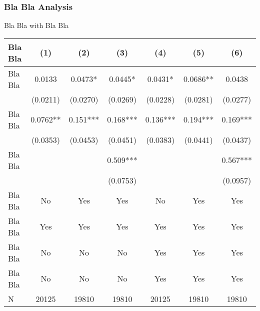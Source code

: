 \documentclass{beamer}
\begin{document}
\begin{frame}
\frametitle{Bla Bla Analysis}
Bla Bla with Bla Bla
\begin{table}
\centering
\tiny
\label{tab:diff_in_diff}
\begin{tabular}{lcccccc}
\toprule
Bla Bla & (1) & (2) & (3) & (4) & (5) & (6)\\
\midrule
Bla Bla & 0.0133 & 0.0473* & 0.0445* & 0.0431* & 0.0686** & 0.0438\\
 & (0.0211) & (0.0270) & (0.0269) & (0.0228) & (0.0281) & (0.0277)\\
Bla Bla & 0.0762** & 0.151*** & 0.168*** & 0.136*** & 0.194*** & 0.169***\\
 & (0.0353) & (0.0453) & (0.0451) & (0.0383) & (0.0441) & (0.0437)\\
Bla Bla &  &  & 0.509*** &  &  & 0.567***\\
 &  &  & (0.0753) &  &  & (0.0957)\\
 \midrule
Bla Bla & No & Yes & Yes & No & Yes & Yes\\
Bla Bla & Yes & Yes & Yes & Yes & Yes & Yes\\
Bla Bla & No & No & No & Yes & Yes & Yes\\
Bla Bla & No & No & No & Yes & Yes & Yes\\
\midrule
N & 20125 & 19810 & 19810 & 20125 & 19810 & 19810\\
\bottomrule
\end{tabular}
\end{table}
\end{frame}
\end{document}
